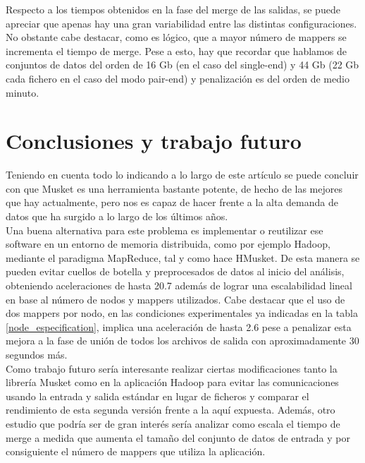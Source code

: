 \documentclass[conference]{IEEEtran}
\begin{document}
Respecto a los tiempos obtenidos en la fase del merge de las salidas, se puede apreciar que apenas hay una gran variabilidad entre las distintas configuraciones. No obstante cabe destacar, como es lógico, que a mayor número de mappers se incrementa el tiempo de merge. Pese a esto, hay que recordar que hablamos de conjuntos de datos del orden de 16 Gb (en el caso del single-end) y 44 Gb (22 Gb cada fichero en el caso del modo pair-end) y penalización es del orden de medio minuto.

\section{Conclusiones y trabajo futuro}
Teniendo en cuenta todo lo indicando a lo largo de este artículo se puede concluir con que Musket es una herramienta bastante potente, de hecho de las mejores que hay actualmente, pero nos es capaz de hacer frente a la alta demanda de datos que ha surgido a lo largo de los últimos años.\\
Una buena alternativa para este problema es implementar o reutilizar ese software en un entorno de memoria distribuida, como por ejemplo Hadoop, mediante el paradigma MapReduce, tal y como hace HMusket. De esta manera se pueden evitar cuellos de botella y preprocesados de datos al inicio del análisis, obteniendo aceleraciones de hasta 20.7 además de lograr una escalabilidad lineal en base al número de nodos y mappers utilizados. Cabe destacar que el uso de dos mappers por nodo, en las condiciones experimentales ya indicadas en la tabla \ref{node_especification}, implica una aceleración de hasta 2.6 pese a penalizar esta mejora a la fase de unión de todos los archivos de salida con aproximadamente 30 segundos más.\\ 

Como trabajo futuro sería interesante realizar ciertas modificaciones tanto la librería Musket como en la aplicación Hadoop para evitar las comunicaciones usando la entrada y salida estándar en lugar de ficheros y comparar el rendimiento de esta segunda versión frente a la aquí expuesta. Además, otro estudio que podría ser de gran interés sería analizar como escala el tiempo de merge a medida que aumenta el tamaño del conjunto de datos de entrada y por consiguiente el número de mappers que utiliza la aplicación.\\




\end{document}
